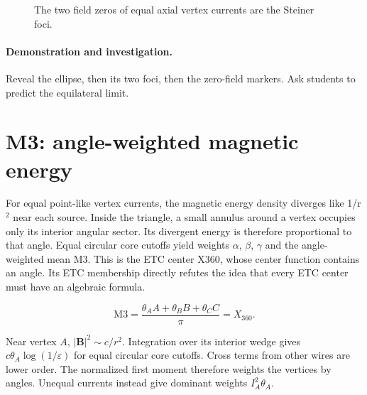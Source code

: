 \documentclass[11pt,oneside,openany]{book}
\begin{document}
\begin{figure}[htbp]
\caption[The two field zeros of equal axial vertex currents are the Steiner foci]{The two field zeros of equal axial vertex currents are the Steiner foci.}\label{fig:geometry-25}
\end{figure}

\paragraph{Demonstration and investigation.} Reveal the ellipse, then its two foci, then the zero-field markers. Ask students to predict the equilateral limit.


\section{M3: angle-weighted magnetic energy}\label{sec:slide26}

For equal point-like vertex currents, the magnetic energy density diverges like 1/r\ensuremath{^2} near each source. Inside the triangle, a small annulus around a vertex occupies only its interior angular sector. Its divergent energy is therefore proportional to that angle. Equal circular core cutoffs yield weights \ensuremath{\alpha}, \ensuremath{\beta}, \ensuremath{\gamma} and the angle-weighted mean M3. This is the ETC center X360, whose center function contains an angle. Its ETC membership directly refutes the idea that every ETC center must have an algebraic formula.


\[\mathrm{M3}=\frac{\theta_AA+\theta_BB+\theta_CC}{\pi}=X_{360}.\]



Near vertex $A$, $|\mathbf B|^2\sim c/r^2$.
Integration over its interior wedge gives
$c\theta_A\log(1/\varepsilon)$ for equal circular core cutoffs.
Cross terms from other wires are lower order. The normalized first
moment therefore weights the vertices by angles.
Unequal currents instead give dominant weights $I_A^2\theta_A$.
\end{document}
